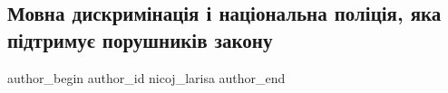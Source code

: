  
 
 
 
 
 
\subsection{Мовна дискримінація і національна поліція, яка підтримує порушників закону}
\label{sec:30_06_2021.fb.nicoj_larisa.1.mova_diskriminacia_policia}
\ifcmt
 author_begin
   author_id nicoj_larisa
 author_end
\fi


